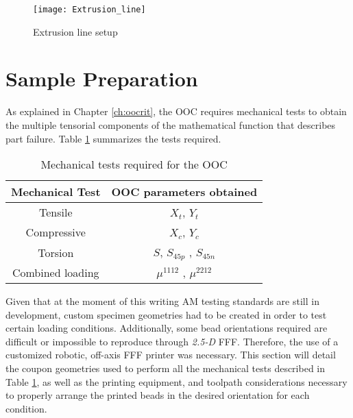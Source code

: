 \documentclass[main.tex]{subfiles}
\begin{document}
\begin{figure}[h]
	\center
	\texttt{[image: Extrusion\_line]}
	\caption{Extrusion line setup} \label{fig:extrLine}
\end{figure}
\pagebreak

\section{Sample Preparation}

As explained in Chapter \ref{ch:oocrit}, the OOC requires mechanical tests to obtain the multiple tensorial components of the mathematical function that describes part failure. Table \ref{tab:testsum} summarizes the tests required.
\begin{table} [h]
\centering
\caption{Mechanical tests required for the OOC}
\begin{tabular}{ c c } 
	\toprule
	\textbf{Mechanical Test} & \textbf{OOC parameters obtained} \\
	\midrule
	Tensile           &   $X_t$, $Y_t$\\
	Compressive       &   $X_c$, $Y_c$\\
	Torsion           &   $S$, $S_{45p}$ , $S_{45n}$\\
	Combined loading  &   $\mu^{1112}$ , $\mu^{2212}$\\
 	\bottomrule
\end{tabular}
\label{tab:testsum}
\end{table}

Given that at the moment of this writing AM testing standards are still in development, custom specimen geometries had to be created in order to test certain loading conditions. Additionally, some bead orientations required are difficult or impossible to reproduce through \emph{2.5-D} FFF. Therefore, the use of a customized robotic, off-axis FFF printer was necessary. This section will detail the coupon geometries used to perform all the mechanical tests described in Table \ref{tab:testsum}, as well as the printing equipment, and toolpath considerations necessary to properly arrange the printed beads in the desired orientation for each condition. 
\end{document}
